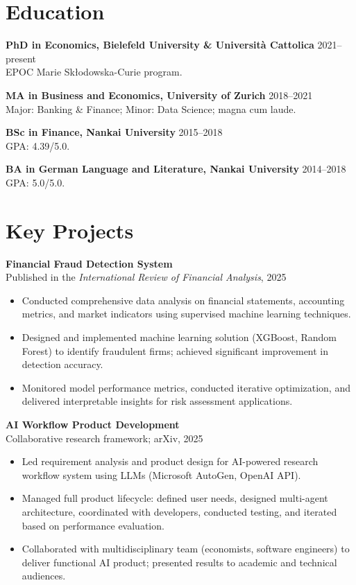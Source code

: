 \documentclass[a4paper,11pt]{article}
\newcommand{\project}[2]{%
  \textbf{#1}\\[-1pt]
  \textcolor{muted}{\small #2}\par
}
\begin{document}
 


\section{Education}
\textbf{PhD in Economics, Bielefeld University \& Universit\`a Cattolica} \hfill 2021--present\\
EPOC Marie Sk\l odowska-Curie program.

\textbf{MA in Business and Economics, University of Zurich} \hfill 2018--2021\\
Major: Banking \& Finance; Minor: Data Science; magna cum laude.

\textbf{BSc in Finance, Nankai University} \hfill 2015--2018\\
GPA: 4.39/5.0.

\textbf{BA in German Language and Literature, Nankai University} \hfill 2014--2018\\
GPA: 5.0/5.0.

\section{Key Projects}
\project{Financial Fraud Detection System}{Published in the \textit{International Review of Financial Analysis}, 2025}
\begin{itemize}
  \item Conducted comprehensive data analysis on financial statements, accounting metrics, and market indicators using supervised machine learning techniques.
  \item Designed and implemented machine learning solution (XGBoost, Random Forest) to identify fraudulent firms; achieved significant improvement in detection accuracy.
  \item Monitored model performance metrics, conducted iterative optimization, and delivered interpretable insights for risk assessment applications.
\end{itemize}


\project{AI Workflow Product Development}{Collaborative research framework; arXiv, 2025}
\begin{itemize}
  \item Led requirement analysis and product design for AI-powered research workflow system using LLMs (Microsoft AutoGen, OpenAI API).
  \item Managed full product lifecycle: defined user needs, designed multi-agent architecture, coordinated with developers, conducted testing, and iterated based on performance evaluation.
  \item Collaborated with multidisciplinary team (economists, software engineers) to deliver functional AI product; presented results to academic and technical audiences.
\end{itemize}
\end{document}
